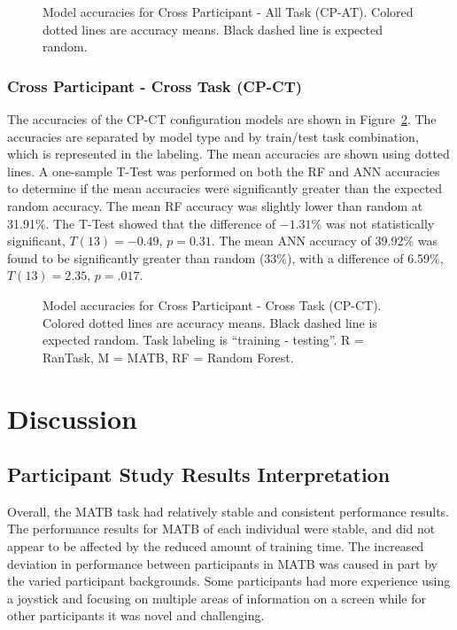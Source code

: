 \documentclass[11pt]{article}
\begin{document}
		\begin{figure}
		\centering
		\caption[Cross Participant - All Task (CP-AT) Model Accuracies]{ Model accuracies for Cross Participant - All Task (CP-AT). Colored dotted lines are accuracy means. Black dashed line is expected random. }
		\label{fig:cp-at}
		\end{figure} 
		
		\subsubsection{Cross Participant - Cross Task (CP-CT)}
		The accuracies of the CP-CT configuration models are shown in Figure~\ref{fig:cp-ct}. The accuracies are separated by model type and by train/test task combination, which is represented in the labeling. The mean accuracies are shown using dotted lines. A one-sample T-Test was performed on both the RF and ANN accuracies to determine if the mean accuracies were significantly greater than the expected random accuracy. The mean RF accuracy was slightly lower than random at 31.91\%. The T-Test showed that the difference of \(-1.31\%\) was not statistically significant, \(T(13) = -0.49\), \(p = 0.31\). The mean ANN accuracy of 39.92\% was found to be significantly greater than random (33\%), with a difference of 6.59\%, \(T(13) = 2.35\), \(p = .017\).
		
		\begin{figure}
		\centering
		\caption[Cross Participant - Cross Task (CP-CT) Model Accuracies]{ Model accuracies for Cross Participant - Cross Task (CP-CT). Colored dotted lines are accuracy means. Black dashed line is expected random. Task labeling is ``training - testing''. R = RanTask, M = MATB, RF = Random Forest. }
		\label{fig:cp-ct}
		\end{figure} 

		
\section{Discussion}
	\subsection{Participant Study Results Interpretation}
	
	Overall, the MATB task had relatively stable and consistent performance results. The performance results for MATB of each individual were stable, and did not appear to be affected by the reduced amount of training time. The increased deviation in performance between participants in MATB was caused in part by the varied participant backgrounds. Some participants had more experience using a joystick and focusing on multiple areas of information on a screen while for other participants it was novel and challenging. 
	
\end{document}
